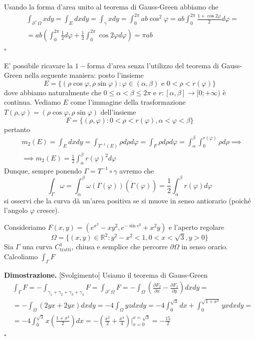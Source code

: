 	Usando la forma d'area unito al teorema di Gauss-Green abbiamo che
	\[\begin{aligned}
	&\int_{\partial^{+} \Omega} xdy = \int_E dxdy = \int_{\gamma} xdy = \int_0^{2\pi} ab \cos^2{\varphi} = ab \int_0^{2\pi} \frac{1+\cos{2\varphi}}{2}d\varphi = \\
	&=ab \left( \int_0^{2\pi} \frac{1}{2} d\varphi + \frac{1}{2} \int_0^{2\pi} \cos{2\varphi} d\varphi \right) = \pi ab
	\end{aligned}\]
\hfill $\square$
%
\begin{remark}
	E' possibile ricavare la $1-$forma d'area senza l'utilizzo del teorema di Gauss-Green nella seguente maniera: posto l'insieme
	$$
	E = \{(\rho \cos{\varphi}, \rho \sin{\varphi}): \varphi \in (\alpha, \beta) \text{ e } 0 < \rho < r(\varphi) \}
	$$
	dove abbiamo naturalmente che $0 \leq \alpha < \beta \leq 2\pi$ e $r: [\alpha, \beta] \to [0; +\infty)$ è continua. Vediamo $E$ come l'immagine della trasformazione $T(\rho, \varphi) = (\rho \cos{\varphi}, \rho \sin{\varphi})$ dell'insieme
	$$
	F = \{(\rho, \varphi) : 0 < \rho < r(\varphi), \alpha < \varphi < \beta \}
	$$
	pertanto
	\[\begin{aligned}
	&m_2(E) = \int_E dxdy = \int_{T^{-1}(E)} \rho d \rho d\varphi = \int_{F} \rho d\rho d\varphi = \int_{\alpha}^{\beta} \int_0^{r(\varphi)} \rho d\rho \implies \\
	&\implies m_2(E) = \frac{1}{2} \int_\alpha^\beta r(\varphi)^2 d\varphi
	\end{aligned}\]
	Dunque, sempre ponendo $\Gamma = T^{-1} \circ \gamma$ avremo che
	$$
	\int_\Gamma \omega = \int_\alpha^\beta \omega(\Gamma(\varphi))(\dot{\Gamma}(\varphi)) = \frac{1}{2} \int_{\alpha}^{\beta} r(\varphi) d\varphi
	$$
	si osservi che la curva dà un'area positiva se si muove in senso antiorario (poiché l'angolo $\varphi$ cresce).
\end{remark}
%
\vspace{0.5cm}
\begin{exercise}
Consideriamo $F(x, y) = (e^{x^2}-xy^2, e^{-\sin{e^y}} + x^2 y)$ e l'aperto regolare
$$
\Omega = \{(x, y) \in \mathbb{R}^2 : y^2 - x^2 < 1, 0 < x < \sqrt{3}, y > 0 \}
$$
Sia $\Gamma$ una curva $C^1_\text{tratti}$, chiusa e semplice che percorre $\partial \Omega$ in senso orario. Calcoliamo $\int_\Gamma F$
\end{exercise}
%
\noindent \textbf{Dimostrazione. }[Svolgimento]
	Usiamo il teorema di Gauss-Green
	\[\begin{aligned}
	&\int_\Gamma F = -\int_{\gamma_1 + \gamma_2 + \gamma_3 + \gamma_4} F = \int_{\partial^{+} \Omega} F = -\int_{\Omega} \left( \frac{\partial F_2}{\partial x} - \frac{\partial F_1}{\partial y} \right) dxdy = \\
	&=-\int_\Omega (2yx + 2yx) dxdy = -4\int_\Omega yz dxdy = - 4 \int_0^{\sqrt{3}} dx + \int_0^{\sqrt{1+x^2}} yx dxdy = \\
	&=- 4 \int_0^{\sqrt{3}} x \left( \frac{1+x^2}{2} \right) dx = -\left( \frac{x^2}{2} + \frac{x^4}{4} \right)\Bigg|_{x=0}^{x=\sqrt{3}} = - \frac{15}{2}
	\end{aligned}\]
\hfill $\square$
%
%
\vspace{0.5cm}
